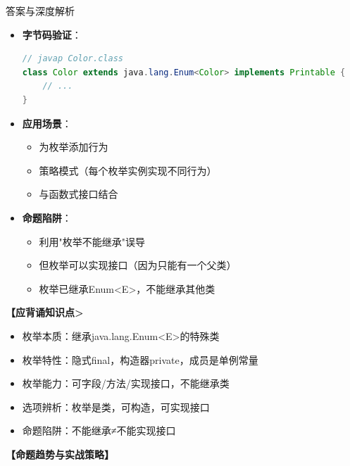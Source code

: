 \documentclass[12pt, a4paper]{ctexart}
\begin{document}
\begin{enumerate}[label=\textbf{\arabic*.}]
\begin{bluebox}{答案与深度解析}
\begin{itemize}[leftmargin=*, nosep, label={}]
\begin{itemize}[label={}, leftmargin=*, nosep]
\begin{lstlisting}[language=Java]
// 使用
Color.RED.print();  // "红色"
Size.SMALL.print(); // "Size: SMALL"
				            \end{lstlisting}
				            \item \textbf{字节码验证}：
				                  \begin{lstlisting}[language=Java]
// javap Color.class
class Color extends java.lang.Enum<Color> implements Printable {
    // ...
}
				            \end{lstlisting}
				            \item \textbf{应用场景}：
				                  \begin{itemize}[label={}, nosep]
					                  \item 为枚举添加行为
					                  \item 策略模式（每个枚举实例实现不同行为）
					                  \item 与函数式接口结合
				                  \end{itemize}
				            \item \textbf{命题陷阱}：
				                  \begin{itemize}[label={}, nosep]
					                  \item 利用"枚举不能继承"误导
					                  \item 但枚举可以实现接口（因为只能有一个父类）
					                  \item 枚举已继承Enum<E>，不能继承其他类
				                  \end{itemize}
			            \end{itemize}
		      \end{itemize}

		      \textbf{【应背诵知识点>}
		      \begin{itemize}[label={}, nosep]
			      \item 枚举本质：继承java.lang.Enum<E>的特殊类
			      \item 枚举特性：隐式final，构造器private，成员是单例常量
			      \item 枚举能力：可字段/方法/实现接口，不能继承类
			      \item 选项辨析：枚举是类，可构造，可实现接口
			      \item 命题陷阱：不能继承≠不能实现接口
		      \end{itemize}

		      \textbf{【命题趋势与实战策略】}


\end{bluebox}
\end{enumerate}
\end{document}

